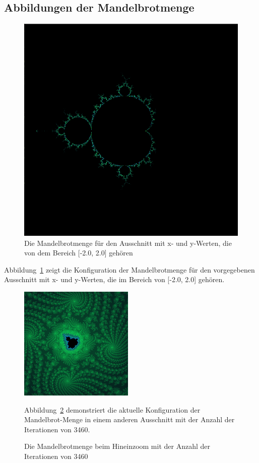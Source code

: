 \documentclass[ngerman,12pt,a4paper,titlepage]{article}
\begin{document}
\subsection{Abbildungen der Mandelbrotmenge}
\begin{sloppypar}
\begin{figure}[H]
	\centering
	\includegraphics[width=0.8\linewidth]{Mandelbrotmenge}
	\caption[Die Mandelbrotmenge]{Die Mandelbrotmenge für den Ausschnitt mit x- und y-Werten, die von dem Bereich [-2.0, 2.0] gehören}
	\label{fig:Mandelbrotmenge}
\end{figure}
Abbildung~\ref{fig:Mandelbrotmenge} zeigt die Konfiguration der Mandelbrotmenge für den vorgegebenen Ausschnitt mit x- und y-Werten, die im Bereich von [-2.0, 2.0] gehören.

\begin{figure}[H]
	\centering
	\includegraphics[width=0.8\linewidth]{Mandelbrotmenge beim Hineinzoomen}
	\caption[Die Mandelbrotmenge beim Hineinzoomen]{Die Mandelbrotmenge beim Hineinzoom mit der Anzahl der Iterationen von 3460}
	\label{fig:Mandelbrotmenge beim Hineinzoomen}
Abbildung~\ref{fig:Mandelbrotmenge beim Hineinzoomen} demonstriert die aktuelle Konfiguration der Mandelbrot-Menge in einem anderen Ausschnitt mit der Anzahl der Iterationen von 3460.
\end{figure}
\end{sloppypar}
\end{document}

